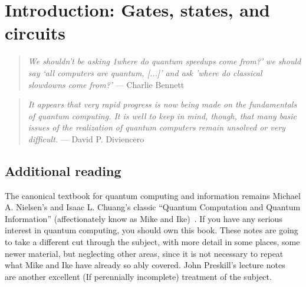 

\clearpage


\clearpage
\section{Introduction: Gates, states, and circuits}


\begin{quote}
\emph{We shouldn't be asking 1where do quantum speedups come from?' we should say `all computers are quantum, [...]' and ask 'where do classical slowdowns come from?'} --- Charlie Bennett~\cite{???}
\end{quote}


\begin{quote}
\emph{It appears that very rapid progress is now being made on the fundamentals of quantum computing. It is well to keep in mind, though, that many basic issues of the realization of quantum computers remain unsolved or very difficult.} --- David P. Diviencero ~\cite{DiVincenzo1995a}
\end{quote}

%
%
%
%
%
%
%

\subsection{Additional reading}
The canonical textbook for quantum computing and information remains Michael A. Nielsen's and Isaac L. Chuang's   
classic ``Quantum Computation and Quantum Information'' (affectionately know as Mike and Ike)~\cite{Nielsen2000a}.  
If you have any serious interest in quantum computing, you should own this book.
These notes are 
going to take a different cut through the subject, with more detail in some places, some newer material, but neglecting other areas, since it is not necessary to repeat what Mike and Ike have already so ably covered. John Preskill's lecture notes~\cite{PreskillLectureNotes} are another excellent (If perennially incomplete) treatment of the subject.

